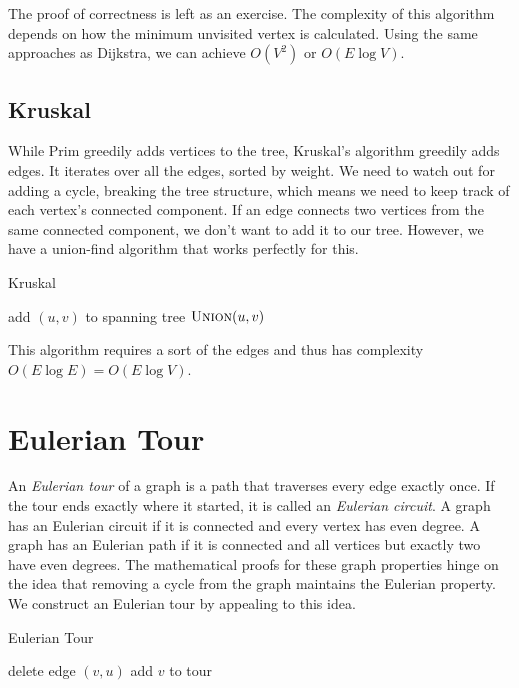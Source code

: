 The proof of correctness is left as an exercise. The complexity of this algorithm depends on how the minimum unvisited vertex is calculated. Using the same approaches as Dijkstra, we can achieve $O(V^2)$ or $O(E \log{V})$.

\subsection{Kruskal}

While Prim greedily adds vertices to the tree, Kruskal's algorithm greedily adds edges. It iterates over all the edges, sorted by weight. We need to watch out for adding a cycle, breaking the tree structure, which means we need to keep track of each vertex's connected component. If an edge connects two vertices from the same connected component, we don't want to add it to our tree. However, we have a union-find algorithm that works perfectly for this.

\begin{algorithm}[H]
\caption{Kruskal}
\begin{algorithmic}
		\State add $(u,v)$ to spanning tree
		\State $\Call{Union}{u,v}$
	\EndIf
\EndFor
\end{algorithmic}
\end{algorithm}

This algorithm requires a sort of the edges and thus has complexity $O(E \log{E}) = O(E \log{V})$.

\section{Eulerian Tour}

An \textit{Eulerian tour} of a graph is a path that traverses every edge exactly once. If the tour ends exactly where it started, it is called an \textit{Eulerian circuit}. A graph has an Eulerian circuit if it is connected and every vertex has even degree. A graph has an Eulerian path if it is connected and all vertices but exactly two have even degrees. The mathematical proofs for these graph properties hinge on the idea that removing a cycle from the graph maintains the Eulerian property. We construct an Eulerian tour by appealing to this idea.

\begin{algorithm}[H]
\caption{Eulerian Tour}
\begin{algorithmic}
	\State delete edge $(v,u)$
	\State {}
\EndWhile
\State add $v$ to tour
\EndFunction
\end{algorithmic}
\end{algorithm}

